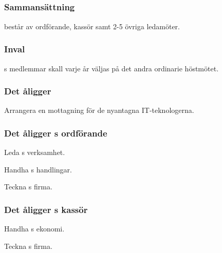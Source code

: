 \subsection{\NOLLKITFULL}
\subsubsection{Sammansättning}
\NOLLKIT{} består av ordförande, kassör samt 2-5 övriga ledamöter.

\subsubsection{Inval}
\NOLLKIT{}s medlemmar skall varje år väljas på det andra ordinarie höstmötet.

\subsubsection{Det åligger \NOLLKIT}
\begin{att}
	\item Arrangera en mottagning för de nyantagna IT-teknologerna.
\end{att}

\subsubsection{Det åligger \NOLLKIT{}s ordförande}
\begin{att}
	\item Leda \NOLLKIT{}s verksamhet.
	\item Handha \NOLLKIT{}s handlingar.
	\item Teckna \NOLLKIT{}s firma.
\end{att}

\subsubsection{Det åligger \NOLLKIT{}s kassör}
\begin{att}
	\item Handha \NOLLKIT{}s ekonomi.
	\item Teckna \NOLLKIT{}s firma.
\end{att}